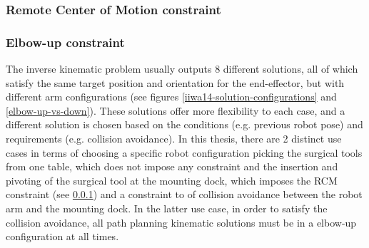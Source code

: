 \subsubsection{Remote Center of Motion constraint}
\label{rcm-subsubsection}


\subsubsection{Elbow-up constraint}
\label{section-elbow-up-constraints}

The inverse kinematic problem usually outputs 8 different solutions, all of which satisfy the same target position and orientation for the end-effector, but with different arm configurations (see figures 
\ref{iiwa14-solution-configurations} and \ref{elbow-up-vs-down}). These solutions offer more flexibility to each case, and a different solution is chosen based on the conditions (e.g. previous robot pose) and 
requirements (e.g. collision avoidance). In this thesis, there are 2 distinct use cases in terms of choosing a specific robot configuration picking the surgical tools from one table, which does not impose any constraint
and the insertion and pivoting of the surgical tool at the mounting dock, which imposes the RCM constraint (see \ref{rcm-subsubsection}) and a constraint to of collision avoidance between the robot arm and the mounting dock.
In the latter use case, in order to satisfy the collision avoidance, all path planning kinematic solutions must be in a elbow-up configuration at all times.

